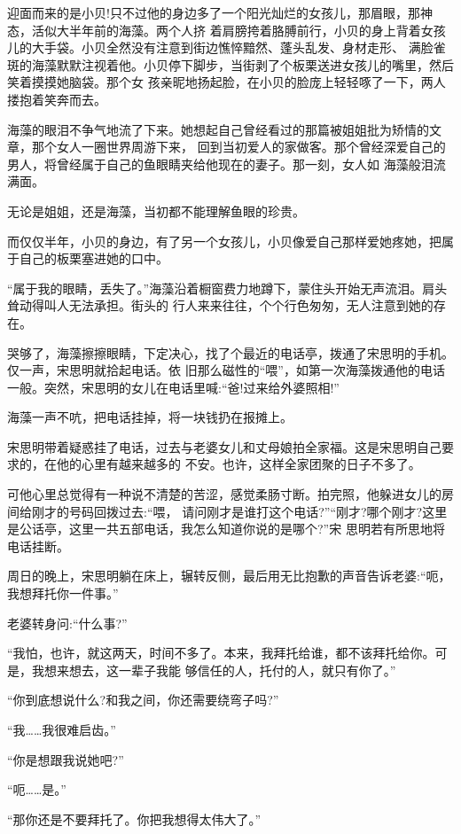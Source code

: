 \documentclass[11pt,a4paper,onecolumn]{article}
\begin{document}
迎面而来的是小贝!只不过他的身边多了一个阳光灿烂的女孩儿，那眉眼，那神态，活似大半年前的海藻。两个人挤
着肩膀挎着胳膊前行，小贝的身上背着女孩儿的大手袋。小贝全然没有注意到街边憔悴黯然、蓬头乱发、身材走形、
满脸雀斑的海藻默默注视着他。小贝停下脚步，当街剥了个板栗送进女孩儿的嘴里，然后笑着摸摸她脑袋。那个女
孩亲昵地扬起脸，在小贝的脸庞上轻轻啄了一下，两人搂抱着笑奔而去。

海藻的眼泪不争气地流了下来。她想起自己曾经看过的那篇被姐姐批为矫情的文章，那个女人一圈世界周游下来，
回到当初爱人的家做客。那个曾经深爱自己的男人，将曾经属于自己的鱼眼睛夹给他现在的妻子。那一刻，女人如
海藻般泪流满面。

无论是姐姐，还是海藻，当初都不能理解鱼眼的珍贵。

而仅仅半年，小贝的身边，有了另一个女孩儿，小贝像爱自己那样爱她疼她，把属于自己的板栗塞进她的口中。

``属于我的眼睛，丢失了。''海藻沿着橱窗费力地蹲下，蒙住头开始无声流泪。肩头耸动得叫人无法承担。街头的
行人来来往往，个个行色匆匆，无人注意到她的存在。

哭够了，海藻擦擦眼睛，下定决心，找了个最近的电话亭，拨通了宋思明的手机。仅一声，宋思明就拾起电话。依
旧那么磁性的``喂''，如第一次海藻拨通他的电话一般。突然，宋思明的女儿在电话里喊:``爸!过来给外婆照相!''

海藻一声不吭，把电话挂掉，将一块钱扔在报摊上。

宋思明带着疑惑挂了电话，过去与老婆女儿和丈母娘拍全家福。这是宋思明自己要求的，在他的心里有越来越多的
不安。也许，这样全家团聚的日子不多了。

可他心里总觉得有一种说不清楚的苦涩，感觉柔肠寸断。拍完照，他躲进女儿的房间给刚才的号码回拨过去:``喂，
请问刚才是谁打这个电话?''``刚才?哪个刚才?这里是公话亭，这里一共五部电话，我怎么知道你说的是哪个?''宋
思明若有所思地将电话挂断。

周日的晚上，宋思明躺在床上，辗转反侧，最后用无比抱歉的声音告诉老婆:``呃，我想拜托你一件事。''

老婆转身问:``什么事?''

``我怕，也许，就这两天，时间不多了。本来，我拜托给谁，都不该拜托给你。可是，我想来想去，这一辈子我能
够信任的人，托付的人，就只有你了。''

``你到底想说什么?和我之间，你还需要绕弯子吗?''

``我……我很难启齿。''

``你是想跟我说她吧?''

``呃……是。''

``那你还是不要拜托了。你把我想得太伟大了。''
\end{document}
